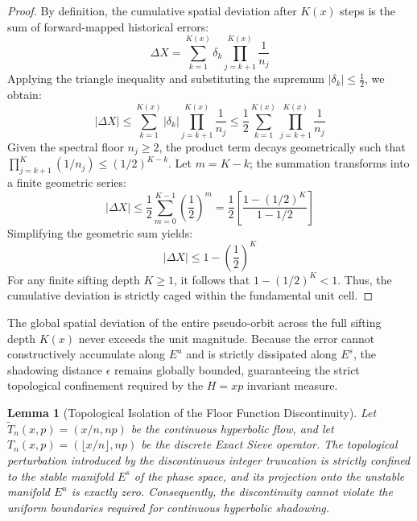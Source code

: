 \documentclass[sn-mathphys-num, pdflatex]{sn-jnl}
\newtheorem{lemma}{Lemma}
\begin{document}
\begin{proof}
By definition, the cumulative spatial deviation after $K(x)$ steps is the sum of forward-mapped historical errors:
\begin{equation}
\Delta X = \sum_{k=1}^{K(x)} \delta_k \prod_{j=k+1}^{K(x)} \frac{1}{n_j}
\end{equation}
Applying the triangle inequality and substituting the supremum $|\delta_k| \le \frac{1}{2}$, we obtain:
\begin{equation}
|\Delta X| \le \sum_{k=1}^{K(x)} |\delta_k| \prod_{j=k+1}^{K(x)} \frac{1}{n_j} \le \frac{1}{2} \sum_{k=1}^{K(x)} \prod_{j=k+1}^{K(x)} \frac{1}{n_j}
\end{equation}
Given the spectral floor $n_j \ge 2$, the product term decays geometrically such that $\prod_{j=k+1}^{K} (1/n_j) \le (1/2)^{K-k}$. Let $m = K-k$; the summation transforms into a finite geometric series:
\begin{equation}
|\Delta X| \le \frac{1}{2} \sum_{m=0}^{K-1} \left( \frac{1}{2} \right)^m = \frac{1}{2} \left[ \frac{1 - (1/2)^K}{1 - 1/2} \right]
\end{equation}
Simplifying the geometric sum yields:
\begin{equation}
|\Delta X| \le 1 - \left( \frac{1}{2} \right)^K
\end{equation}
For any finite sifting depth $K \ge 1$, it follows that $1 - (1/2)^K < 1$. Thus, the cumulative deviation is strictly caged within the fundamental unit cell.
\end{proof}The global spatial deviation of the entire pseudo-orbit across the full sifting depth $K(x)$ never exceeds the unit magnitude. Because the error cannot constructively accumulate along $E^u$ and is strictly dissipated along $E^s$, the shadowing distance $\epsilon$ remains globally bounded, guaranteeing the strict topological confinement required by the $H=xp$ invariant measure.

\begin{lemma}[Topological Isolation of the Floor Function Discontinuity]
\label{lemma:discontinuity_isolation}
Let $\tilde{T}_n(x,p) = (x/n, np)$ be the continuous hyperbolic flow, and let $T_n(x,p) = (\lfloor x/n \rfloor, np)$ be the discrete Exact Sieve operator. The topological perturbation introduced by the discontinuous integer truncation is strictly confined to the stable manifold $E^s$ of the phase space, and its projection onto the unstable manifold $E^u$ is exactly zero. Consequently, the discontinuity cannot violate the uniform boundaries required for continuous hyperbolic shadowing.
\end{lemma}
\end{document}
